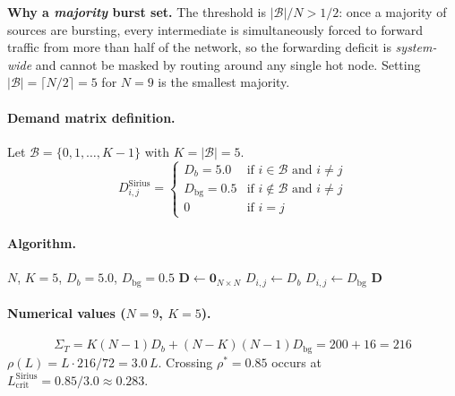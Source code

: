 \documentclass{article}
\begin{document}
    \textbf{Why a \emph{majority} burst set.}  The threshold is $|\mathcal{B}|/N > 1/2$: once a majority of sources are bursting, every intermediate is simultaneously forced to forward traffic from more than half of the network, so the forwarding deficit is \emph{system-wide} and cannot be masked by routing around any single hot node.  Setting $|\mathcal{B}| = \lceil N/2 \rceil = 5$ for $N=9$ is the smallest majority.

    \paragraph{Demand matrix definition.}  Let $\mathcal{B} = \{0,1,\ldots,K{-}1\}$ with $K = |\mathcal{B}| = 5$.
    \begin{equation}
        D^{\text{Sirius}}_{i,j} =
        \begin{cases}
            D_b    = 5.0 & \text{if } i \in \mathcal{B} \text{ and } i \neq j \\
            D_{\text{bg}} = 0.5 & \text{if } i \notin \mathcal{B} \text{ and } i \neq j \\
            0             & \text{if } i = j
        \end{cases}
        \label{eq:matrix_sirius}
    \end{equation}

    \paragraph{Algorithm.}
    \begin{algorithmic}[1]
        \Require $N$, $K=5$, $D_b=5.0$, $D_{\text{bg}}=0.5$
        \State $\mathbf{D} \gets \mathbf{0}_{N \times N}$
                        $D_{i,j} \gets D_b$
                    \Else
                        $D_{i,j} \gets D_{\text{bg}}$
                    \EndIf
                \EndIf
            \EndFor
        \EndFor
        \State \Return $\mathbf{D}$
    \end{algorithmic}

    \paragraph{Numerical values ($N=9$, $K=5$).}
    \[
        \Sigma_T = K(N{-}1)D_b + (N{-}K)(N{-}1)D_{\text{bg}} = 200 + 16 = 216
    \]
    $\rho(L) = L\cdot 216/72 = 3.0\,L$.  Crossing $\rho^*=0.85$ occurs at $L_{\text{crit}}^{\text{Sirius}} = 0.85/3.0 \approx 0.283$.
\end{document}
